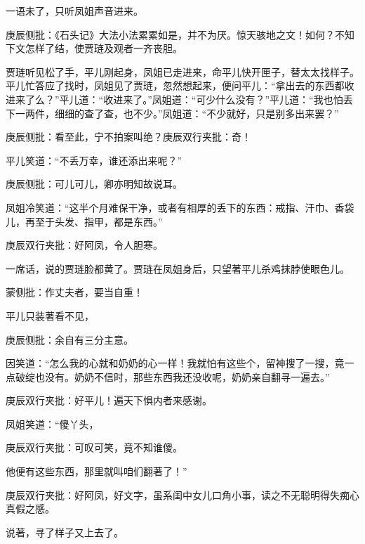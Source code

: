 \begin{parag}


    一语未了，只听凤姐声音进来。\begin{note}庚辰侧批：《石头记》大法小法累累如是，并不为厌。惊天骇地之文！如何？不知下文怎样了结，使贾琏及观者一齐丧胆。\end{note}贾琏听见松了手，平儿刚起身，凤姐已走进来，命平儿快开匣子，替太太找样子。平儿忙答应了找时，凤姐见了贾琏，忽然想起来，便问平儿：“拿出去的东西都收进来了么？”平儿道：“收进来了。”凤姐道：“可少什么没有？”平儿道：“我也怕丢下一两件，细细的查了查，也不少。”凤姐道：“不少就好，只是别多出来罢？”\begin{note}庚辰侧批：看至此，宁不拍案叫绝？庚辰双行夹批：奇！\end{note}平儿笑道：“不丢万幸，谁还添出来呢？”\begin{note}庚辰侧批：可儿可儿，卿亦明知故说耳。\end{note}凤姐冷笑道：“这半个月难保干净，或者有相厚的丢下的东西：戒指、汗巾、香袋儿，再至于头发、指甲，都是东西。”\begin{note}庚辰双行夹批：好阿凤，令人胆寒。\end{note}一席话，说的贾琏脸都黄了。贾琏在凤姐身后，只望著平儿杀鸡抹脖使眼色儿。\begin{note}蒙侧批：作丈夫者，要当自重！\end{note}平儿只装著看不见，\begin{note}庚辰侧批：余自有三分主意。\end{note}因笑道：“怎么我的心就和奶奶的心一样！我就怕有这些个，留神搜了一搜，竟一点破绽也没有。奶奶不信时，那些东西我还没收呢，奶奶亲自翻寻一遍去。”\begin{note}庚辰双行夹批：好平儿！遍天下惧内者来感谢。\end{note}凤姐笑道：“傻丫头，\begin{note}庚辰双行夹批：可叹可笑，竟不知谁傻。\end{note}他便有这些东西，那里就叫咱们翻著了！”\begin{note}庚辰双行夹批：好阿凤，好文字，虽系闺中女儿口角小事，读之不无聪明得失痴心真假之感。\end{note}说著，寻了样子又上去了。
\end{parag}


